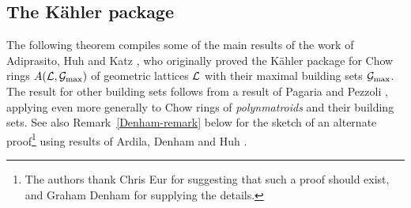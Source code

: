 \subsection{The K\"ahler package}
\label{AHK-section}
The following theorem compiles
some of the main results of the work of
Adiprasito, Huh and Katz \cite{AHK}, who originally proved the K\"ahler package for Chow rings $A(\mathcal{L},\mathcal{G}_{\max})$ of geometric lattices $\mathcal{L}$ with their maximal building sets $\mathcal{G}_{\max}$.
The result for other
building sets
follows from a result of Pagaria
and Pezzoli \cite[Thm.~4.21]{PagariaPezzoli}, applying even more generally to Chow rings of {\it polynmatroids} and their building sets.
See also Remark~\ref{Denham-remark} below
for the sketch of an alternate proof\footnote{The authors thank Chris Eur for suggesting that such a proof should exist, and Graham Denham for supplying the details.}
using results of Ardila, Denham and Huh \cite{ADH}.

